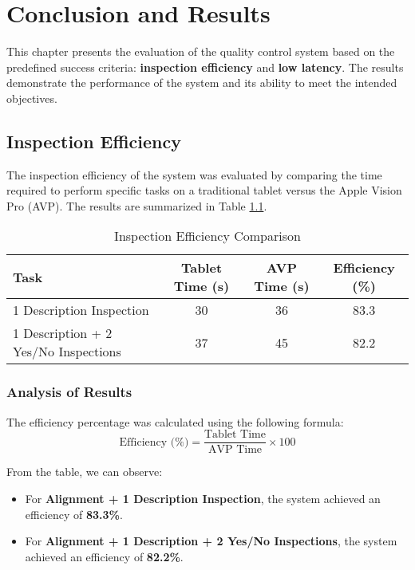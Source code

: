 \chapter{Conclusion and Results}

This chapter presents the evaluation of the quality control system based on the predefined success criteria: \textbf{inspection efficiency} and \textbf{low latency}. The results demonstrate the performance of the system and its ability to meet the intended objectives.

\section{Inspection Efficiency}

The inspection efficiency of the system was evaluated by comparing the time required to perform specific tasks on a traditional tablet versus the Apple Vision Pro (AVP). The results are summarized in Table \ref{tab:inspection_efficiency}.

\begin{table}[h!]
    \centering
    \caption{Inspection Efficiency Comparison}
    \label{tab:inspection_efficiency}
    \begin{tabular}{|l|c|c|c|}
        \hline
        \textbf{Task} & \textbf{Tablet Time (s)} & \textbf{AVP Time (s)} & \textbf{Efficiency (\%)} \\
        \hline
        1 Description Inspection & 30 & 36 & 83.3 \\
        1 Description + 2 Yes/No Inspections & 37 & 45 & 82.2 \\
        \hline
    \end{tabular}
\end{table}

\subsection{Analysis of Results}
The efficiency percentage was calculated using the following formula:
\[
\text{Efficiency (\%)} = \frac{\text{Tablet Time}}{\text{AVP Time}} \times 100
\]

From the table, we can observe:
\begin{itemize}
    \item For \textbf{Alignment + 1 Description Inspection}, the system achieved an efficiency of \textbf{83.3\%}.
    \item For \textbf{Alignment + 1 Description + 2 Yes/No Inspections}, the system achieved an efficiency of \textbf{82.2\%}.
\end{itemize}

